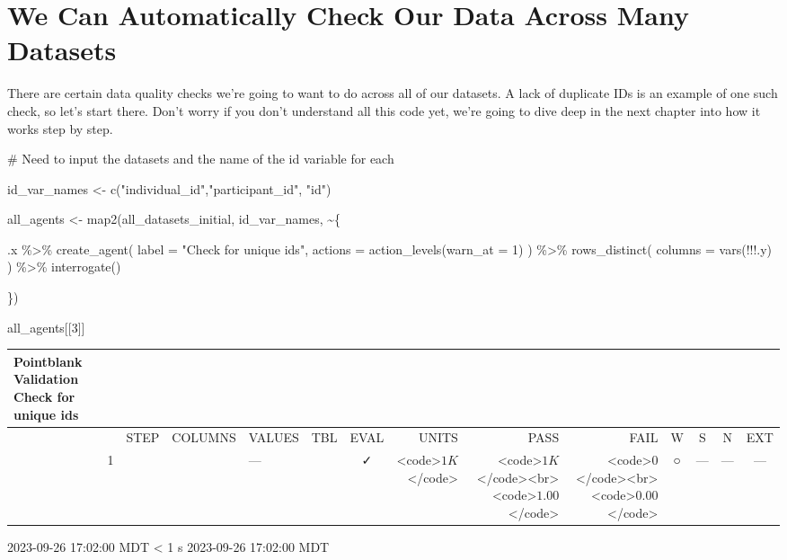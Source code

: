 \documentclass[
  letterpaper,
  DIV=11,
  numbers=noendperiod]{scrreprt}
\newenvironment{Shaded}{\begin{snugshade}}{\end{snugshade}}
\newcommand{\AttributeTok}[1]{\textcolor[rgb]{0.40,0.45,0.13}{#1}}
\newcommand{\CommentTok}[1]{\textcolor[rgb]{0.37,0.37,0.37}{#1}}
\newcommand{\DecValTok}[1]{\textcolor[rgb]{0.68,0.00,0.00}{#1}}
\newcommand{\FunctionTok}[1]{\textcolor[rgb]{0.28,0.35,0.67}{#1}}
\newcommand{\NormalTok}[1]{\textcolor[rgb]{0.00,0.23,0.31}{#1}}
\newcommand{\OtherTok}[1]{\textcolor[rgb]{0.00,0.23,0.31}{#1}}
\newcommand{\SpecialCharTok}[1]{\textcolor[rgb]{0.37,0.37,0.37}{#1}}
\newcommand{\StringTok}[1]{\textcolor[rgb]{0.13,0.47,0.30}{#1}}
\begin{document}
\hypertarget{we-can-automatically-check-our-data-across-many-datasets}{%
\section{We Can Automatically Check Our Data Across Many
Datasets}\label{we-can-automatically-check-our-data-across-many-datasets}}

There are certain data quality checks we're going to want to do across
all of our datasets. A lack of duplicate IDs is an example of one such
check, so let's start there. Don't worry if you don't understand all
this code yet, we're going to dive deep in the next chapter into how it
works step by step.

\begin{Shaded}
\begin{Highlighting}[]
\CommentTok{\# Need to input the datasets and the name of the id variable for each}

\NormalTok{id\_var\_names }\OtherTok{\textless{}{-}} \FunctionTok{c}\NormalTok{(}\StringTok{"individual\_id"}\NormalTok{,}\StringTok{"participant\_id"}\NormalTok{, }\StringTok{"id"}\NormalTok{)}

\NormalTok{all\_agents }\OtherTok{\textless{}{-}} \FunctionTok{map2}\NormalTok{(all\_datasets\_initial, id\_var\_names, }\SpecialCharTok{\textasciitilde{}}\NormalTok{\{}
  
\NormalTok{  .x }\SpecialCharTok{\%\textgreater{}\%}
    \FunctionTok{create\_agent}\NormalTok{(}
      \AttributeTok{label =} \StringTok{"Check for unique ids"}\NormalTok{,}
      \AttributeTok{actions =} \FunctionTok{action\_levels}\NormalTok{(}\AttributeTok{warn\_at =} \DecValTok{1}\NormalTok{)}
\NormalTok{    ) }\SpecialCharTok{\%\textgreater{}\%}
    \FunctionTok{rows\_distinct}\NormalTok{(}
      \AttributeTok{columns =} \FunctionTok{vars}\NormalTok{(}\SpecialCharTok{!!!}\NormalTok{.y)}
\NormalTok{    ) }\SpecialCharTok{\%\textgreater{}\%}
    \FunctionTok{interrogate}\NormalTok{()}
  
\NormalTok{\})}

\NormalTok{all\_agents[[}\DecValTok{3}\NormalTok{]]}
\end{Highlighting}
\end{Shaded}

\setlength{\LTpost}{0mm}
\begin{longtable}{lrlllccrrrcccc}
\caption*{
{\large Pointblank Validation} \\ 
{\small Check for unique ids}
} \\ 
\toprule
 &  & STEP & COLUMNS & VALUES & TBL & EVAL & UNITS & PASS & FAIL & W & S & N & EXT \\ 
\midrule
 & 1 &  &  & — &                                                              & ✓ & <code>$1K$</code> & <code>$1K$</code><br><code>$1.00$</code> & <code>$0$</code><br><code>$0.00$</code> & ○ & --- & --- & --- \\ 
\bottomrule
\end{longtable}
\begin{minipage}{\linewidth}
2023-09-26 17:02:00 MDT
\textless{} 1 s
2023-09-26 17:02:00 MDT\\
\end{minipage}
\end{document}
